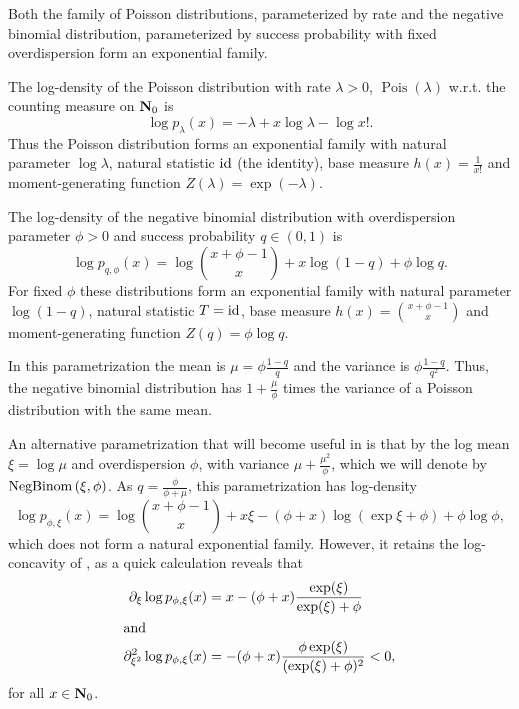 \begin{example}
    \label{ex:pois_negbinom}
    Both the family of Poisson distributions, parameterized by rate and the negative binomial distribution, parameterized by success probability with fixed overdispersion form an exponential family.

    The log-density of the Poisson distribution with rate $\lambda > 0$, $\operatorname{Pois} (\lambda)$ w.r.t. the counting measure on $\mathbf N_{0}$ is 
    $$
    \log p_{\lambda} (x) = -\lambda + x\log \lambda - \log x!.
    $$
    Thus the Poisson distribution forms an exponential family with natural parameter $\log \lambda$, natural statistic $\operatorname{id}$ (the identity), base measure $h(x) = \frac{1}{x!}$ and moment-generating function $Z(\lambda) = \exp \left( -\lambda \right)$. 

    The log-density of the negative binomial distribution with overdispersion parameter $\phi > 0$ and success probability $q \in (0, 1)$ is 
    $$
    \log p_{q,\phi}(x) = \log \binom{x + \phi - 1}{x} + x \log (1 - q) + \phi \log q.
    $$
    For fixed $\phi$ these distributions form an exponential family with natural parameter $\log (1 - q )$, natural statistic $T = \operatorname{id}$, base measure $h(x) = \binom{x + \phi - 1}{x}$ and moment-generating function $Z(q) = \phi \log q$. 

    In this parametrization the mean is $\mu = \phi \frac{1 - q}{q}$ and the variance is $\phi \frac{1 - q}{q^{2}}$. 
    Thus, the negative binomial distribution has $1 + \frac{\mu}{\phi}$ times the variance of a Poisson distribution with the same mean. 

    An alternative parametrization that will become useful in  is that by the log mean $\xi = \log \mu$ and overdispersion $\phi$, with variance $\mu + \frac{\mu^{2}}{\phi}$, which we will denote by $\operatorname{NegBinom} \left( \xi, 
    \phi \right)$. 
    As $q = \frac{\phi}{\phi + \mu}$, this parametrization has log-density
    $$
    \log p_{\phi,\xi}(x) = \log \binom{x + \phi - 1}{x} + x \xi  - (\phi + x) \log (\exp \xi + \phi) + \phi \log \phi,
    $$
    which does not form a natural exponential family. However, it retains the log-concavity of , as a quick calculation reveals that 
    \begin{align*}
        \partial_{\xi} \log p_{\phi,\xi} (x) &= x - (\phi + x) \frac{\exp (\xi)}{\exp (\xi) + \phi} \\
        \intertext{and}
        \partial_{\xi^{2}}^{2} \log p_{\phi,\xi} (x) &= -(\phi + x) \frac{\phi\exp(\xi)}{(\exp(\xi) + \phi)^{2}} < 0,
    \end{align*}
    for all $x \in \mathbf N_{0}$. 
\end{example}


